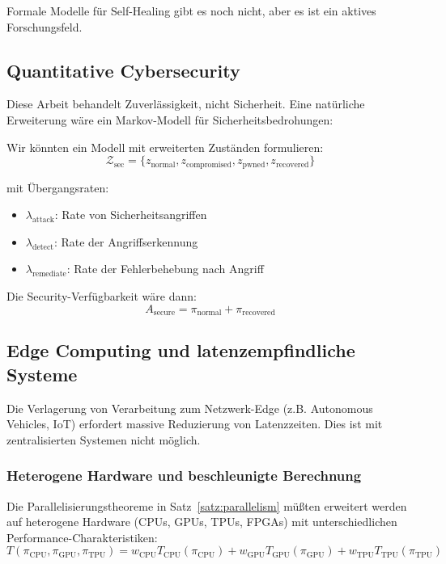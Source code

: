 \documentclass[a4paper,11pt]{article}
\theoremstyle{definition}
\begin{document}
Formale Modelle für Self-Healing gibt es noch nicht, aber es ist ein aktives Forschungsfeld.

\subsection{Quantitative Cybersecurity}

Diese Arbeit behandelt Zuverlässigkeit, nicht Sicherheit. Eine natürliche Erweiterung 
wäre ein Markov-Modell für Sicherheitsbedrohungen:

Wir könnten ein Modell mit erweiterten Zuständen formulieren:
\[
    \mathcal{Z}_{\text{sec}} = \{z_{\text{normal}}, z_{\text{compromised}}, z_{\text{pwned}}, z_{\text{recovered}}\}
\]

mit Übergangsraten:
\begin{itemize}
    \item $\lambda_{\text{attack}}$: Rate von Sicherheitsangriffen
    \item $\lambda_{\text{detect}}$: Rate der Angriffserkennung
    \item $\lambda_{\text{remediate}}$: Rate der Fehlerbehebung nach Angriff
\end{itemize}

Die Security-Verfügbarkeit wäre dann:
\[
    A_{\text{secure}} = \pi_{\text{normal}} + \pi_{\text{recovered}}
\]

\subsection{Edge Computing und latenzempfindliche Systeme}

Die Verlagerung von Verarbeitung zum Netzwerk-Edge (z.B. Autonomous Vehicles, IoT) erfordert 
massive Reduzierung von Latenzzeiten. Dies ist mit zentralisierten Systemen nicht möglich.

\subsubsection{Heterogene Hardware und beschleunigte Berechnung}

Die Parallelisierungstheoreme in Satz~\ref{satz:parallelism} müßten erweitert werden auf 
heterogene Hardware (CPUs, GPUs, TPUs, FPGAs) mit unterschiedlichen Performance-Charakteristiken:
\[
    T(\pi_{\text{CPU}}, \pi_{\text{GPU}}, \pi_{\text{TPU}}) = 
    w_{\text{CPU}} T_{\text{CPU}}(\pi_{\text{CPU}}) + 
    w_{\text{GPU}} T_{\text{GPU}}(\pi_{\text{GPU}}) + 
    w_{\text{TPU}} T_{\text{TPU}}(\pi_{\text{TPU}})
\]
\end{document}
